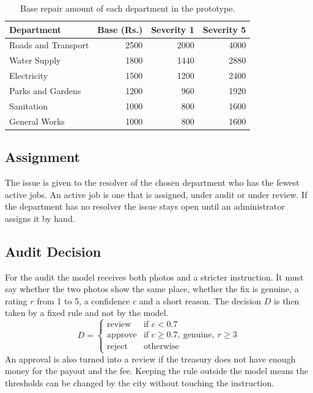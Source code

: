 \documentclass[conference,a4paper]{IEEEtran}
\begin{document}
\begin{table}[!t]\centering\footnotesize
\caption{Base repair amount of each department in the prototype.}\label{tab:base}
\begin{tabular}{L{3.2cm}rrr}\toprule
\textbf{Department} & \textbf{Base (Rs.)} & \textbf{Severity 1} & \textbf{Severity 5}\\\midrule
Roads and Transport & 2500 & 2000 & 4000\\
Water Supply & 1800 & 1440 & 2880\\
Electricity & 1500 & 1200 & 2400\\
Parks and Gardens & 1200 & 960 & 1920\\
Sanitation & 1000 & 800 & 1600\\
General Works & 1000 & 800 & 1600\\\bottomrule
\end{tabular}\end{table}

\subsection{Assignment}
The issue is given to the resolver of the chosen department who has the fewest active jobs. An active job is one that is assigned, under audit or under review. If the department has no resolver the issue stays open until an administrator assigns it by hand.

\subsection{Audit Decision}
For the audit the model receives both photos and a stricter instruction. It must say whether the two photos show the same place, whether the fix is genuine, a rating $r$ from 1 to 5, a confidence $c$ and a short reason. The decision $D$ is then taken by a fixed rule and not by the model.
\begin{equation}
D=\begin{cases}
\text{review} & \text{if } c < 0.7\\
\text{approve} & \text{if } c \ge 0.7,\ \text{genuine},\ r \ge 3\\
\text{reject} & \text{otherwise}
\end{cases}
\end{equation}
An approval is also turned into a review if the treasury does not have enough money for the payout and the fee. Keeping the rule outside the model means the thresholds can be changed by the city without touching the instruction.
\end{document}
